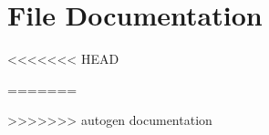 \documentclass[twoside]{book}
\newcommand{\+}{\discretionary{\mbox{\scriptsize$\hookleftarrow$}}{}{}}
\newcommand{\clearemptydoublepage}{%
  \newpage{\pagestyle{empty}\cleardoublepage}%
}
\begin{document}
\chapter{File Documentation}
<<<<<<< HEAD


=======






>>>>>>> autogen documentation

\backmatter
\newpage
{}
\clearemptydoublepage
{}
\printindex
\end{document}
